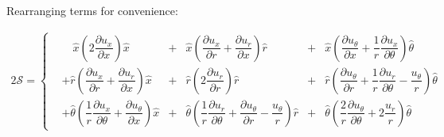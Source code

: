\documentclass{kthreport}
\begin{document}
Rearranging terms for convenience:

\begin{eqnarray}
	2\mathcal{S} = \left\{
	\begin{split}
		& \quad \hat{x}\left(2\dfrac{\partial u_{x}}{\partial x}\right)\hat{x} &+& \hat{x}\left(\dfrac{\partial u_{x}}{\partial r} + \dfrac{\partial u_{r}}{\partial x}			\right)\hat{r}  &+& \hat{x}\left(\dfrac{\partial u_{\theta}}{\partial x} + \dfrac{1}{r}\dfrac{\partial u_{x}}{\partial \theta} \right)\hat{\theta}  \\	
		& + \hat{r}\left(\dfrac{\partial u_{x}}{\partial r} + \dfrac{\partial u_{r}}{\partial x}			\right)\hat{x}  &+& \hat{r}\left(2\dfrac{\partial u_{r}}{\partial r}\right) \hat{r} & +& \hat{r}\left(\dfrac{\partial u_{\theta}}{\partial r} + \dfrac{1}{r}\dfrac{\partial u_{r}}{\partial \theta} - \dfrac{u_{\theta}}{r}	\right)\hat{\theta} \\
		& + \hat{\theta}\left(\dfrac{1}{r}\dfrac{\partial u_{x}}{\partial \theta} + \dfrac{\partial u_{\theta}}{\partial x} \right)\hat{x} & + & \hat{\theta}\left(\dfrac{1}{r}\dfrac{\partial u_{r}}{\partial \theta} + \dfrac{\partial u_{\theta}}{\partial r} - \dfrac{u_{\theta}}{r} \right) \hat{r} &+& \hat{\theta}\left(\dfrac{2}{r}\dfrac{\partial u_{\theta}}{\partial \theta} + 2\dfrac{u_{r}}{r}	\right)\hat{\theta}
	\end{split}\right.
\end{eqnarray}
\end{document}
